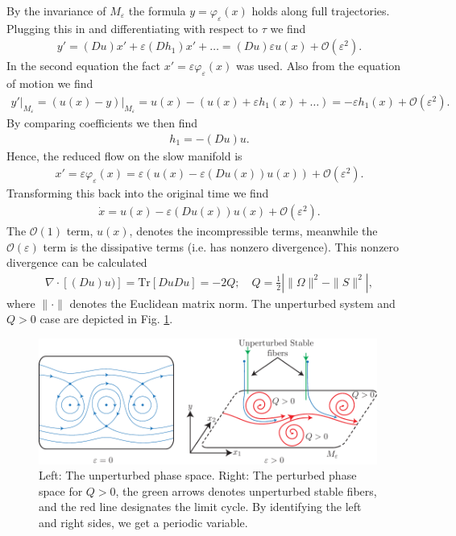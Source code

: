 \begin{ex}
By the invariance of $M_{\varepsilon}$ the formula $y=\varphi_{\varepsilon}(x)$ holds along full trajectories. Plugging this in and differentiating with respect to $\tau$ we find
\begin{align}
	y' = (Du)x' + \varepsilon (Dh_{1})x' + \ldots = (Du) \varepsilon u(x) + \mathcal{O}(\varepsilon^{2}).
\end{align}
In the second equation the fact $x'=\varepsilon \varphi_{\varepsilon}(x)$ was used. Also from the equation of motion we find
\begin{align}
	\left. y'\right|_{M_{\varepsilon}} = \left. \left(u(x) - y\right) \right|_{M_{\varepsilon}} = u(x) - \left(u(x) + \varepsilon h_{1}(x) + \ldots\right) = - \varepsilon h_{1}(x) + \mathcal{O}(\varepsilon^{2}).
\end{align}
By comparing coefficients we then find
\begin{align}
	h_{1} = - (Du)u.
\end{align}
Hence, the reduced flow on the slow manifold is
\begin{align}
	x' = \varepsilon \varphi_{\varepsilon}(x) = \varepsilon \left( u(x) - \varepsilon (Du(x)) u(x) \right) + \mathcal{O}(\varepsilon^{2}).
\end{align}
Transforming this back into the original time we find
\begin{align}
	\dot{x} = u(x) - \varepsilon (Du(x))u(x) + \mathcal{O}(\varepsilon^{2}).
\end{align}
The $\mathcal{O}(1)$ term, $u(x)$, denotes the incompressible terms, meanwhile the $\mathcal{O}(\varepsilon)$ term is the dissipative terms (i.e. has nonzero divergence). This nonzero divergence can be calculated
\begin{align}
	\nabla \cdot \left[ (Du)u) \right] =  \textrm{Tr} \left[ Du Du\right] = - 2Q;\quad Q = \frac{1}{2}\left| \|\Omega\|^{2} - \| S\|^{2} \right|,
\end{align}
where $\| \cdot \|$ denotes the Euclidean matrix norm. The unperturbed system and $Q>0$ case are depicted in Fig. \ref{fig:clustering_Qpos}.
\begin{figure}[h!]
	\centering
	\includegraphics[width=0.99\textwidth]{figures/ch9/23Qpos_clustering.pdf}
	\caption{Left: The unperturbed phase space. Right: The perturbed phase space for $Q>0$, the green arrows denotes unperturbed stable fibers, and the red line designates the limit cycle. By identifying the left and right sides, we get a periodic variable.}
	\label{fig:clustering_Qpos}
\end{figure}


\end{ex}
